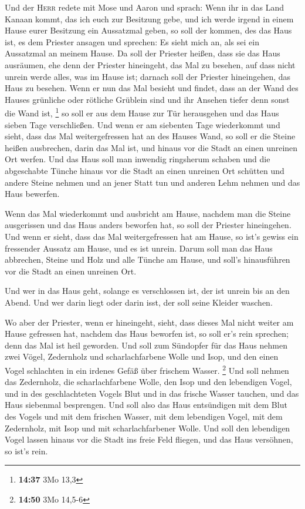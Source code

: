  Und der \textsc{Herr} redete mit Mose und Aaron und
sprach:  Wenn ihr in das Land Kanaan kommt, das ich euch
zur Besitzung gebe, und ich werde irgend in einem Hause eurer Besitzung
ein Aussatzmal geben,  so soll der kommen, des das Haus
ist, es dem Priester ansagen und sprechen: Es sieht mich an, als sei ein
Aussatzmal an meinem Hause.  Da soll der Priester heißen,
dass sie das Haus ausräumen, ehe denn der Priester hineingeht, das Mal
zu besehen, auf dass nicht unrein werde alles, was im Hause ist; darnach
soll der Priester hineingehen, das Haus zu besehen.  Wenn
er nun das Mal besieht und findet, dass an der Wand des Hauses grünliche
oder rötliche Grüblein sind und ihr Ansehen tiefer denn sonst die Wand
ist, \footnote{\textbf{14:37} 3Mo 13,3}  so soll er aus
dem Hause zur Tür herausgehen und das Haus sieben Tage verschließen.
 Und wenn er am siebenten Tage wiederkommt und sieht,
dass das Mal weitergefressen hat an des Hauses Wand,  so
soll er die Steine heißen ausbrechen, darin das Mal ist, und hinaus vor
die Stadt an einen unreinen Ort werfen.  Und das Haus
soll man inwendig ringsherum schaben und die abgeschabte Tünche hinaus
vor die Stadt an einen unreinen Ort schütten  und andere
Steine nehmen und an jener Statt tun und anderen Lehm nehmen und das
Haus bewerfen.

 Wenn das Mal wiederkommt und ausbricht am Hause, nachdem
man die Steine ausgerissen und das Haus anders beworfen hat,
 so soll der Priester hineingehen. Und wenn er sieht,
dass das Mal weitergefressen hat am Hause, so ist's gewiss ein
fressender Aussatz am Hause, und es ist unrein.  Darum
soll man das Haus abbrechen, Steine und Holz und alle Tünche am Hause,
und soll's hinausführen vor die Stadt an einen unreinen Ort.

 Und wer in das Haus geht, solange es verschlossen ist,
der ist unrein bis an den Abend.  Und wer darin liegt
oder darin isst, der soll seine Kleider waschen.

 Wo aber der Priester, wenn er hineingeht, sieht, dass
dieses Mal nicht weiter am Hause gefressen hat, nachdem das Haus
beworfen ist, so soll er's rein sprechen; denn das Mal ist heil
geworden.  Und soll zum Sündopfer für das Haus nehmen
zwei Vögel, Zedernholz und scharlachfarbene Wolle und Isop,
 und den einen Vogel schlachten in ein irdenes Gefäß über
frischem Wasser. \footnote{\textbf{14:50} 3Mo 14,5-6} 
Und soll nehmen das Zedernholz, die scharlachfarbene Wolle, den Isop und
den lebendigen Vogel, und in des geschlachteten Vogels Blut und in das
frische Wasser tauchen, und das Haus siebenmal besprengen.
 Und soll also das Haus entsündigen mit dem Blut des
Vogels und mit dem frischen Wasser, mit dem lebendigen Vogel, mit dem
Zedernholz, mit Isop und mit scharlachfarbener Wolle. 
Und soll den lebendigen Vogel lassen hinaus vor die Stadt ins freie Feld
fliegen, und das Haus versöhnen, so ist's rein.

